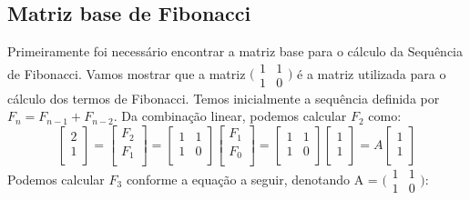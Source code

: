 \documentclass[10pt,a4paper]{article}
\begin{document}
\subsection{Matriz base de Fibonacci}
Primeiramente foi necessário encontrar a matriz base para o cálculo da Sequência de Fibonacci. Vamos mostrar que a matriz 
$\bigl(\begin{smallmatrix}
1&1\\ 1&0
\end{smallmatrix} \bigr)$
é a matriz utilizada para o cálculo dos termos de Fibonacci. 
Temos inicialmente a sequência definida por $F_n=F_{n-1} + F_{n-2}$. Da combinação linear, podemos calcular $F_2$ como:
\begin{equation}\nonumber
     \begin{bmatrix}
       2\\ 1\\
     \end{bmatrix}
     =
     \begin{bmatrix}
       F_2\\ F_1\\
     \end{bmatrix}
     =
     \begin{bmatrix}
     1&1 \\ 1&0 \\
     \end{bmatrix}
     \begin{bmatrix}
     F_1\\ F_0\\
     \end{bmatrix}
     =
     \begin{bmatrix}
     1&1 \\ 1&0 \\
     \end{bmatrix}
     \begin{bmatrix}
       1\\ 1\\
     \end{bmatrix}
     =
     A      \begin{bmatrix}
       1\\ 1\\
     \end{bmatrix}
\end{equation}
Podemos calcular $F_3$ conforme a equação a seguir, denotando A = $\bigl(\begin{smallmatrix}
1&1\\ 1&0
\end{smallmatrix} \bigr)$:
\end{document}
